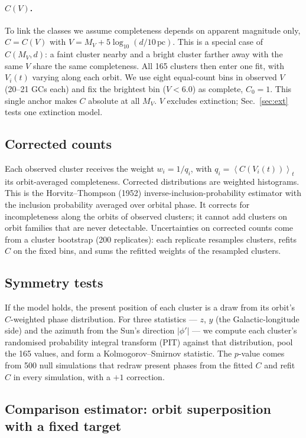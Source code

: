 \documentclass[11pt,a4paper]{article}
\newcommand{\MV}{M_V}
\newcommand{\dhel}{d}
\newcommand{\avg}[1]{\left\langle #1 \right\rangle_t}
\begin{document}
\paragraph{$C(V)$.} To link the classes we assume completeness depends on apparent magnitude only,
$C = C(V)$ with $V = \MV + 5\log_{10}(\dhel/10\,\mathrm{pc})$. This is a special case of
$C(\MV,\dhel)$: a faint cluster nearby and a bright cluster farther away with the same $V$ share
the same completeness. All 165 clusters then enter one fit, with $V_i(t)$ varying along each orbit.
We use eight equal-count bins in observed $V$ (20--21 GCs each) and fix the brightest bin
($V<6.0$) as complete, $C_0 = 1$. This single anchor makes $C$ absolute at all $\MV$. $V$ excludes
extinction; Sec.~\ref{sec:ext} tests one extinction model.

\subsection{Corrected counts}

Each observed cluster receives the weight $w_i = 1/q_i$, with $q_i = \avg{C(V_i(t))}$ its
orbit-averaged completeness. Corrected distributions are weighted histograms. This is the
Horvitz--Thompson (1952) inverse-inclusion-probability estimator with the inclusion probability
averaged over orbital phase. It corrects for incompleteness along the orbits of observed clusters; it
cannot add clusters on orbit families that are never detectable. Uncertainties on corrected counts
come from a cluster bootstrap (200 replicates): each replicate resamples clusters, refits $C$ on the
fixed bins, and sums the refitted weights of the resampled clusters.

\subsection{Symmetry tests}

If the model holds, the present position of each cluster is a draw from its orbit's $C$-weighted
phase distribution. For three statistics --- $z$, $y$ (the Galactic-longitude side) and the
azimuth from the Sun's direction $|\phi'|$ --- we compute each cluster's randomised probability
integral transform (PIT) against that distribution, pool the 165 values, and form a
Kolmogorov--Smirnov statistic. The $p$-value comes from 500 null simulations that redraw present
phases from the fitted $C$ and refit $C$ in every simulation, with a $+1$ correction.

\subsection{Comparison estimator: orbit superposition with a fixed target}
\end{document}

